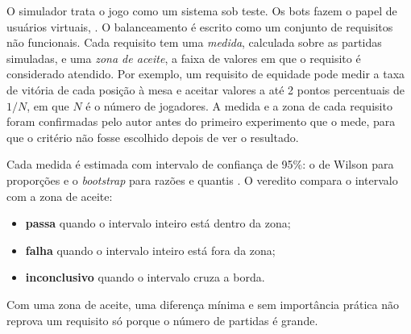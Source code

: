 O simulador trata o jogo como um sistema sob teste. Os bots fazem o papel de usuários virtuais, . O balanceamento é escrito como um conjunto
de requisitos não funcionais. Cada requisito tem uma
\emph{medida}, calculada sobre as partidas simuladas, e uma \emph{zona de aceite}, a faixa de valores em que o
requisito é considerado atendido. Por exemplo, um requisito de equidade pode medir a taxa de vitória de cada
posição à mesa e aceitar valores a até 2 pontos percentuais de $1/N$, em que $N$ é o número de jogadores. A
medida e a zona de cada requisito foram confirmadas pelo autor antes do primeiro experimento que o mede, para que
o critério não fosse escolhido depois de ver o resultado.



Cada medida é estimada com intervalo de confiança de 95\%: o de Wilson para proporções \cite{wilson1927} e o
\emph{bootstrap} para razões e quantis \cite{efron1993}. O veredito compara o intervalo com a zona de aceite:
\begin{itemize}
  \item \textbf{passa} quando o intervalo inteiro está dentro da zona;
  \item \textbf{falha} quando o intervalo inteiro está fora da zona;
  \item \textbf{inconclusivo} quando o intervalo cruza a borda.
\end{itemize}
Com uma zona de aceite, uma diferença mínima e sem importância prática não reprova um requisito só porque o
número de partidas é grande.

